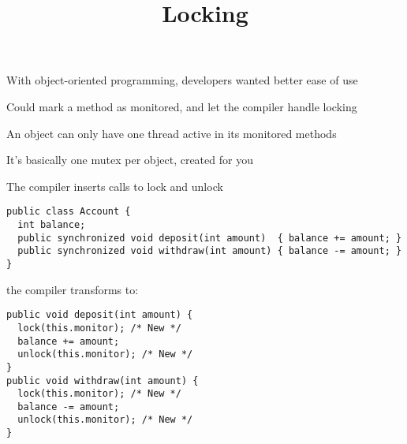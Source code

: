 

\title{Locking}



  \begin{frame}
    \titlepage
  \end{frame}

  \begin{slide}

    With object-oriented programming, developers wanted better ease of use
    \medskip

    Could mark a method as monitored, and let the compiler handle locking

    \leftspace{}An object can only have one thread active in its monitored
    methods
    \medskip

    It's basically one mutex per object, created for you

    \leftspace{}The compiler inserts calls to lock and unlock

  \end{slide}

  \begin{slide}


    \begin{verbatim}
public class Account {
  int balance;
  public synchronized void deposit(int amount)  { balance += amount; }
  public synchronized void withdraw(int amount) { balance -= amount; }
}
    \end{verbatim}
    \medskip

    the compiler transforms to:
    \medskip

    \begin{verbatim}
public void deposit(int amount) {
  lock(this.monitor); /* New */
  balance += amount;
  unlock(this.monitor); /* New */
}
public void withdraw(int amount) {
  lock(this.monitor); /* New */
  balance -= amount;
  unlock(this.monitor); /* New */
}
    \end{verbatim}
  \end{slide}

